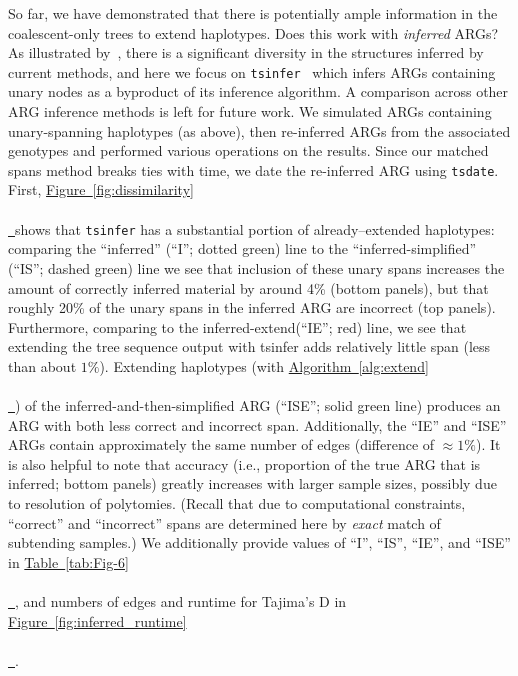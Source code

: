\documentclass[10pt,twoside,lineno]{gsajnl}
\newcommand{\tsinfer}{\texttt{tsinfer}}
\newcommand{\tsdate}{\texttt{tsdate}}
\newcommand{\algorithmref}[2][]{%
	\hyperref[{#2}]{%
		Algorithm~\ref*{#2}%
		\ifx\\#1\\%
		\else
		\,#1%
		\fi
	}%
}
\newcommand*{\figref}[2][]{%
	\hyperref[{#2}]{%
		Figure~\ref*{#2}%
		\ifx\\#1\\%
		\else
		\,#1%
		\fi
	}%
}
\newcommand*{\tabref}[2][]{%
	\hyperref[{#2}]{%
		Table~\ref*{#2}%
		\ifx\\#1\\%
		\else
		\,#1%
		\fi
	}%
}
\begin{document}
So far, we have demonstrated that there is potentially ample information
in the coalescent-only trees to extend haplotypes.
Does this work with \emph{inferred} ARGs?
As illustrated by~\cite{wong2024general}, there is a significant diversity
in the structures inferred by current methods,
and here we focus on \tsinfer{}~\cite{kelleher2019inferring} which 
infers ARGs containing unary nodes as a byproduct of its inference algorithm.
A comparison across other ARG inference methods is left for future work.
We simulated ARGs containing unary-spanning haplotypes (as above), then
re-inferred ARGs from the associated genotypes and performed various operations
on the results.
Since our matched spans method breaks ties with time, 
we date the re-inferred ARG using \tsdate.
First, \figref{fig:dissimilarity} shows that \tsinfer{}
has a substantial portion of already--extended haplotypes:
comparing the ``inferred'' (``I''; dotted green) line to the ``inferred-simplified'' (``IS''; dashed green) line
we see that inclusion of these unary spans increases the amount of correctly inferred material
by around 4\% (bottom panels),
but that roughly 20\% of the unary spans in the inferred ARG are incorrect (top panels).
Furthermore, comparing to the inferred-extend(``IE''; red) line, we see that extending the tree sequence output
with tsinfer adds relatively little span (less than about $1\%$).
Extending haplotypes (with \algorithmref{alg:extend}) of the inferred-and-then-simplified ARG
(``ISE''; solid green line)
produces an ARG with both less correct and incorrect span.
Additionally, the ``IE'' and ``ISE'' ARGs 
contain approximately the same number of edges (difference of $\approx 1\%$).
It is also helpful to note that accuracy
(i.e., proportion of the true ARG that is inferred; bottom panels)
greatly increases with larger sample sizes,
possibly due to resolution of polytomies.
(Recall that due to computational constraints,
``correct'' and ``incorrect'' spans are determined here by \emph{exact} match
of subtending samples.) 
We additionally provide values of ``I'', ``IS'', ``IE'', and ``ISE'' in \tabref{tab:Fig-6},
and numbers of edges and runtime for Tajima's D
in \figref{fig:inferred_runtime}.

%    
%
\end{document}
